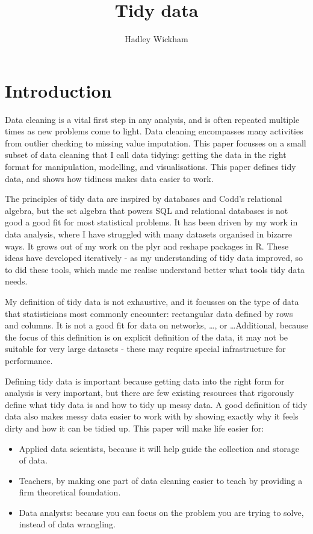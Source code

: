 \documentclass[oneside]{article}
\title{Tidy data}
\author{Hadley Wickham}
\begin{document}
\maketitle

\section{Introduction}

Data cleaning is a vital first step in any analysis, and is often repeated multiple times as new problems come to light. Data cleaning encompasses many activities from outlier checking to missing value imputation. This paper focusses on a small subset of data cleaning that I call data tidying: getting the data in the right format for  manipulation, modelling, and visualisations. This paper defines tidy data, and shows how tidiness makes data easier to work. 

The principles of tidy data are inspired by databases and Codd's relational algebra, but the set algebra that powers SQL and relational databases is not good a good fit for most statistical problems. It has been driven by my work in data analysis, where I have struggled with many datasets organised in bizarre ways. It grows out of my work on the plyr \citep{me:plyr} and reshape \citep{wickham:2007b} packages in R. These ideas have developed iteratively - as my understanding of tidy data improved, so to did these tools, which made me realise understand better what tools tidy data needs.

My definition of tidy data is not exhaustive, and it focusses on the type of data that statisticians most commonly encounter: rectangular data defined by rows and columns. It is not a good fit for data on networks, \ldots, or \ldots Additional, because the focus of this definition is on explicit definition of the data, it may not be suitable for very large datasets - these may require special infrastructure for performance.

Defining tidy data is important because getting data into the right form for analysis is very important, but there are few existing resources that rigorously define what tidy data is and how to tidy up messy data. A good definition of tidy data also makes messy data easier to work with by showing exactly why it feels dirty and how it can be tidied up. This paper will make life easier for:

\begin{itemize}

\item Applied data scientists, because it will help guide the collection and storage of data.

\item Teachers, by making one part of data cleaning easier to teach by providing a firm theoretical foundation.

\item Data analysts: because you can focus on the problem you are trying to solve, instead of data wrangling.

\end{itemize}
\end{document}
